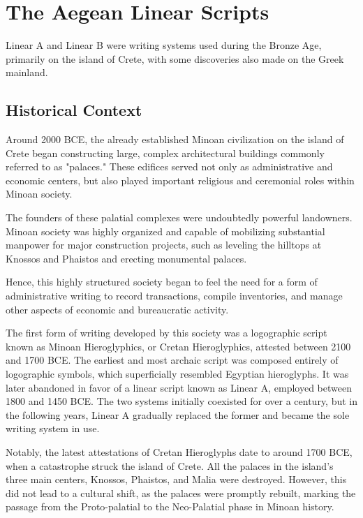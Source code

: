 \chapter{The Aegean Linear Scripts}
Linear A and Linear B were writing systems used during the Bronze Age, primarily on the island of Crete, with some discoveries also made on the Greek mainland.

\section{Historical Context}
Around 2000 BCE, the already established Minoan civilization on the island of Crete began constructing large, complex architectural buildings commonly referred to as "palaces."
These edifices served not only as administrative and economic centers, but also played important religious and ceremonial roles within Minoan society.

The founders of these palatial complexes were undoubtedly powerful landowners.
Minoan society was highly organized and capable of mobilizing substantial manpower for major construction projects, such as leveling the hilltops at Knossos and Phaistos and erecting monumental palaces. \cite{alexiou-ch2}

Hence, this highly structured society began to feel the need for a form of administrative writing to record transactions, compile inventories, and manage other aspects of economic and bureaucratic activity.

The first form of writing developed by this society was a logographic script known as Minoan Hieroglyphics, or Cretan Hieroglyphics, attested between 2100 and 1700 BCE.
The earliest and most archaic script was composed entirely of logographic symbols, which superficially resembled Egyptian hieroglyphs.
It was later abandoned in favor of a linear script known as Linear A, employed between 1800 and 1450 BCE.
The two systems initially coexisted for over a century, but in the following years, Linear A gradually replaced the former and became the sole writing system in use. \cite{salg-ch1}

Notably, the latest attestations of Cretan Hieroglyphs date to around 1700 BCE, when a catastrophe struck the island of Crete.
All the palaces in the island's three main centers, Knossos, Phaistos, and Malia were destroyed.
However, this did not lead to a cultural shift, as the palaces were promptly rebuilt, marking the passage from the Proto-palatial to the Neo-Palatial phase in Minoan history. \cite{alexiou-ch3}

